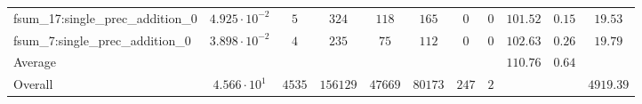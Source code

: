 \begin{tabular}{|l|c|c|c|c|c|c|c|c|c|c|}
fsum\_17:single\_prec\_addition\_0             & $ 4.925 \cdot 10^{-2} $ & $ 5      $ & $ 324    $ & $ 118   $ & $ 165   $ & $ 0   $ & $ 0 $ & $ 101.52      $ & $ 0.15    $ & $ 19.53   $ \\
fsum\_7:single\_prec\_addition\_0              & $ 3.898 \cdot 10^{-2} $ & $ 4      $ & $ 235    $ & $ 75    $ & $ 112   $ & $ 0   $ & $ 0 $ & $ 102.63      $ & $ 0.26    $ & $ 19.79   $ \\
\hline
Average                                        & $                     $ & $        $ & $        $ & $       $ & $       $ & $     $ & $   $ & $ 110.76      $ & $ 0.64    $ & $         $ \\
\hline
Overall                                        & $ 4.566 \cdot 10^{1}  $ & $ 4535   $ & $ 156129 $ & $ 47669 $ & $ 80173 $ & $ 247 $ & $ 2 $ & $             $ & $         $ & $ 4919.39 $ \\
\hline
\end{tabular}
